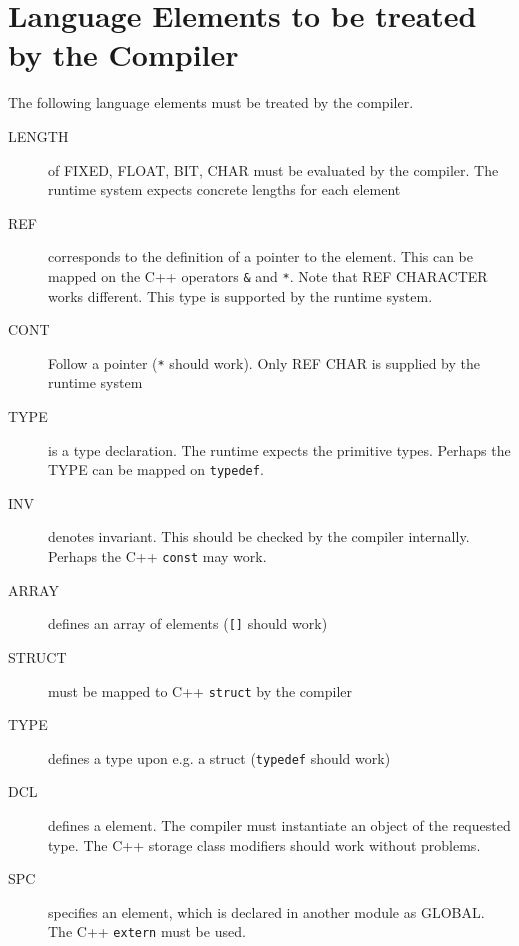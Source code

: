 \chapter{Language Elements to be treated by the Compiler}
The following language elements must be treated by the compiler.

\begin{description}
\item[LENGTH] of FIXED, FLOAT, BIT, CHAR must be evaluated by the 
    compiler. The runtime system expects concrete lengths for each element
\item[REF] corresponds to the definition of a pointer to the 
    element. This can be mapped on the C++ operators \verb|&| and \verb|*|.
    Note that REF CHARACTER works different. This type is supported by the
    runtime system.
\item[CONT] Follow a pointer (\verb|*| should work). 
		Only REF CHAR is supplied by the runtime system
\item[TYPE] is a type declaration. The runtime expects the primitive types.
   Perhaps the TYPE can be mapped on \verb|typedef|.
\item[INV] denotes invariant. This should be checked by the compiler internally.
    Perhaps the C++ \verb|const| may work. 
\item[ARRAY] defines an array of elements (\verb|[]| should work)
\item[STRUCT] must be mapped to C++ \verb|struct| by the compiler
\item[TYPE] defines a type  upon e.g. a struct (\verb|typedef| should work)
\item[DCL] defines a element. The compiler must instantiate an object
    of the requested type. The C++ storage class modifiers should work
    without problems.
\item[SPC] specifies an element, which is declared in another module as
  GLOBAL. The C++ \verb|extern| must be used.
\end{description}

 

